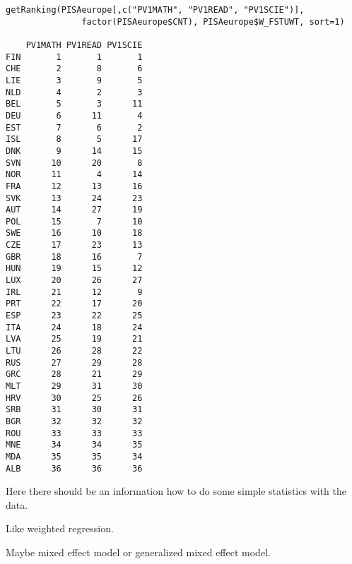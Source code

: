 \begin{shaded}\begin{verbatim}
getRanking(PISAeurope[,c("PV1MATH", "PV1READ", "PV1SCIE")], 
               factor(PISAeurope$CNT), PISAeurope$W_FSTUWT, sort=1)
               
    PV1MATH PV1READ PV1SCIE
FIN       1       1       1
CHE       2       8       6
LIE       3       9       5
NLD       4       2       3
BEL       5       3      11
DEU       6      11       4
EST       7       6       2
ISL       8       5      17
DNK       9      14      15
SVN      10      20       8
NOR      11       4      14
FRA      12      13      16
SVK      13      24      23
AUT      14      27      19
POL      15       7      10
SWE      16      10      18
CZE      17      23      13
GBR      18      16       7
HUN      19      15      12
LUX      20      26      27
IRL      21      12       9
PRT      22      17      20
ESP      23      22      25
ITA      24      18      24
LVA      25      19      21
LTU      26      28      22
RUS      27      29      28
GRC      28      21      29
MLT      29      31      30
HRV      30      25      26
SRB      31      30      31
BGR      32      32      32
ROU      33      33      33
MNE      34      34      35
MDA      35      35      34
ALB      36      36      36
\end{verbatim}\end{shaded}



Here there should be an information how to do some simple statistics with the data.

Like weighted regression.

Maybe mixed effect model or generalized mixed effect model.


